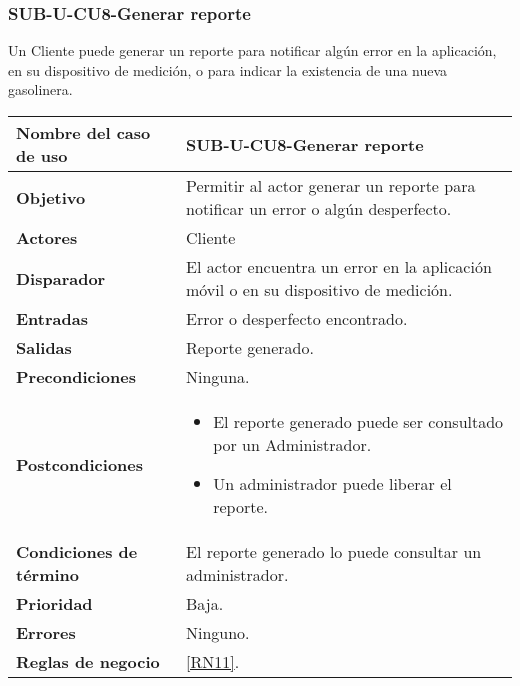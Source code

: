 \subsubsection{SUB-U-CU8-Generar reporte}\label{SUB-U-CU8}
Un Cliente puede generar un reporte para notificar algún error en la aplicación, en su dispositivo de medición, o para indicar la existencia de una nueva gasolinera.
\begin{longtable}{|J{5cm}|J{10.3cm}|}
	\hline
	\textbf{Nombre del caso de uso} &
		SUB-U-CU8-Generar reporte \\ \hline
	\textbf{Objetivo} &
		Permitir al actor generar un reporte para notificar un error o algún desperfecto. \\ \hline
	\textbf{Actores} &
		Cliente \\ \hline 
	\textbf{Disparador} & 
		El actor encuentra un error en la aplicación móvil o en su dispositivo de medición. \\ \hline 
	\textbf{Entradas} & Error o desperfecto encontrado.
		\\ \hline 
	\textbf{Salidas} & Reporte generado.
		\\ \hline
	\textbf{Precondiciones} &
		Ninguna.\\ \hline
	\textbf{Postcondiciones} &
		\begin{itemize}
			\item El reporte generado puede ser consultado por un Administrador.
			\item Un administrador puede liberar el reporte.
		\end{itemize} \\ \hline
	\textbf{Condiciones de término} & El reporte generado lo puede consultar un administrador.
		\\ \hline 
	\textbf{Prioridad} & 
		Baja. \\ \hline
	\textbf{Errores} & Ninguno.
		\\ \hline
	\textbf{Reglas de negocio} & \ref{RN11}.
		 \\ \hline
\end{longtable}

